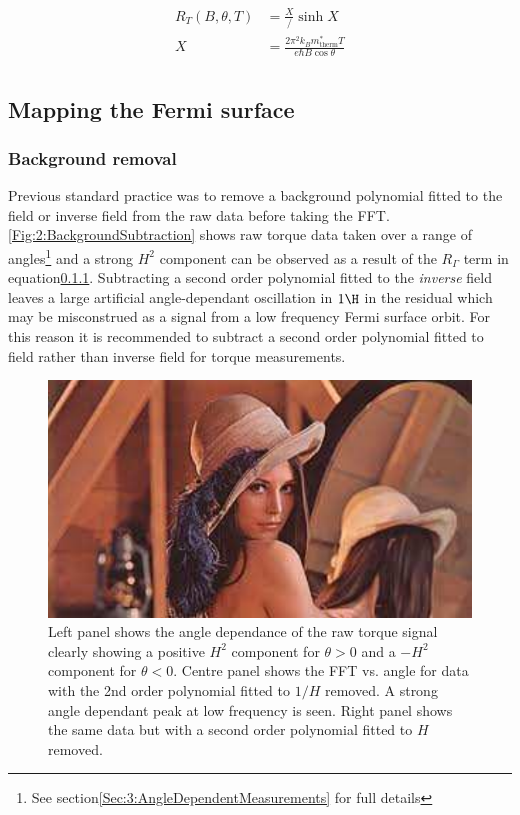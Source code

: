 \begin{align}
R_T(B, \theta, T) &= \frac{X}/{\sinh{X}} \\
X                 &= \frac{2\pi^2k_Bm^*_{\textrm{therm}}T}{e\hbar B\cos{\theta}} \\
\label{Eqn:2:TempTermOscillationAmp}
\end{align}

\subsection{Mapping the Fermi surface}

\subsubsection{Background removal}
Previous standard practice was to remove a background polynomial fitted to the field or inverse field from the raw data before taking the FFT. \Fig\ref{Fig:2:BackgroundSubtraction} shows raw torque data taken over a range of angles\footnote{See section\ref{Sec:3:AngleDependentMeasurements} for full details} and a strong $H^2$ component can be observed as a result of the $R_{\Gamma}$ term in equation\ref{}. Subtracting a second order polynomial fitted to the \textit{inverse} field leaves a large artificial angle-dependant oscillation in $1\H$ in the residual which may be misconstrued as a signal from a low frequency Fermi surface orbit. For this reason it is recommended to subtract a second order polynomial fitted to field rather than inverse field for torque measurements.
\begin{figure}[h!]
    \begin{center}
        \includegraphics[scale=0.7]{Misc/TODO}
        \caption{Left panel shows the angle dependance of the raw torque signal  clearly showing a positive $H^2$ component for $\theta>0$ and a $-H^2$ component for $\theta<0$. Centre panel shows the FFT vs. angle for data with the 2nd order polynomial fitted to $1/H$ removed. A strong angle dependant peak at low frequency is seen. Right panel shows the same data but with a second order polynomial fitted to $H$ removed.}
        \label{Fig:2:BackgroundSubstraction}
    \end{center}
\end{figure}



